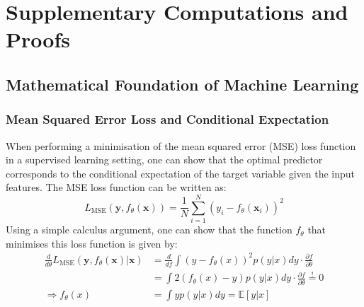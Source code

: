\chapter{Supplementary Computations and Proofs}
\label{chap:supplementary_computations_and_proofs}
\section{Mathematical Foundation of Machine Learning}
\subsection{Mean Squared Error Loss and Conditional Expectation}
When performing a minimisation of the mean squared error (MSE) loss function in a supervised learning setting, one can show that the optimal predictor corresponds to the conditional expectation of the target variable given the input features.
The MSE loss function can be written as:
\begin{equation}
    L_{\text{MSE}}(\mathbf{y}, f_\theta(\mathbf{x})) = \frac{1}{N} \sum_{i=1}^{N} (y_i - f_\theta(\mathbf{x}_i))^2
\end{equation}
Using a simple calculus argument, one can show that the function $f_\theta$ that minimises this loss function is given by:
\begin{align}
    \frac{d}{d\theta} L_{\text{MSE}}(\mathbf{y}, f_\theta(\mathbf{x})|\mathbf{x}) & = \frac{d}{df} \int (y - f_\theta(x))^2 p(y|x) dy \cdot \frac{\partial f}{\partial \theta}   \\
                                                                                  & = \int 2(f_\theta(x) - y) p(y|x) dy \cdot \frac{\partial f}{\partial \theta}\overset{!}{=} 0 \\
    \Rightarrow f_\theta(x)                                                       & = \int y p(y|x) dy = \mathbb{E}[y|x]
\end{align}